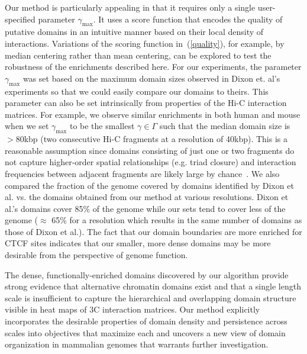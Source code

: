 \documentclass[12pt]{cmuthesis}
\begin{document}
  Our method is particularly appealing in that it requires only a single user-specified parameter $\gamma_{\text{max}}$. It uses a score function that encodes the quality of putative domains in an intuitive manner based on their local density of interactions.  Variations of the scoring function in~(\ref{quality}), for example, by median centering rather than mean centering, can be explored to test the robustness of the enrichments described here. For our experiments, the parameter $\gamma_{\max}$ was set based on the maximum domain sizes observed in Dixon et. al's experiments so that we could easily compare our domains to theirs.  This parameter can also be set intrinsically from properties of the Hi-C interaction matrices.  For example, we observe similar enrichments in both human and mouse when we set $\gamma_{\max}$ to be the smallest $\gamma \in \Gamma$ such that the median domain size is $>$80kbp (two consecutive Hi-C fragments at a resolution of 40kbp). This is a reasonable assumption since domains consisting of just one or two fragments do not capture higher-order spatial relationships (e.g. triad closure) and interaction frequencies between adjacent fragments are likely large by chance~\cite{LiebAid2009}.  We also compared the fraction of the genome covered by domains identified by Dixon et al. vs. the domains obtained from our method at various resolutions.  Dixon et al.'s domains cover 85\% of the genome while our sets tend to cover less of the genome ($\approx$ 65\% for a resolution which results in the same number of domains as those of Dixon et al.).  The fact that our domain boundaries are more enriched for CTCF sites indicates that our smaller, more dense domains may be more desirable from the perspective of genome function.

  The dense, functionally-enriched domains discovered by our algorithm provide strong evidence that alternative chromatin domains exist and that a single length scale is insufficient to capture the hierarchical and overlapping domain structure visible in heat maps of 3C interaction matrices. Our method explicitly incorporates the desirable properties of domain density and persistence across scales into objectives that maximize each and uncovers a new view of domain organization in mammalian genomes that warrants further investigation.


%
%
\end{document}
